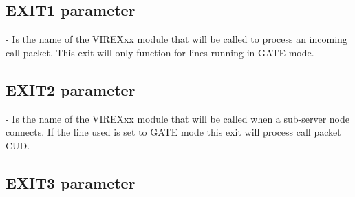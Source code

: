 \documentclass[letterpaper,10pt,english]{sphinxmanual}
\begin{document}
\ignorespaces 

\subsection{EXIT1 parameter}
\label{\detokenize{Installation_Guide:exit1-parameter}}\label{\detokenize{Installation_Guide:index-55}}
\begin{sphinxVerbatim}[commandchars=\\\{\}]
 
\end{sphinxVerbatim}

 - Is the name of the VIREXxx module that will be called to process an incoming call packet. This exit will only function for lines running in GATE mode.

\ignorespaces 

\subsection{EXIT2 parameter}
\label{\detokenize{Installation_Guide:exit2-parameter}}\label{\detokenize{Installation_Guide:index-56}}
\begin{sphinxVerbatim}[commandchars=\\\{\}]
 
\end{sphinxVerbatim}

 - Is the name of the VIREXxx module that will be called when a sub-server node connects. If the line used is set to GATE mode this exit will process call packet CUD.

\ignorespaces 

\subsection{EXIT3 parameter}
\label{\detokenize{Installation_Guide:exit3-parameter}}\label{\detokenize{Installation_Guide:index-57}}
\begin{sphinxVerbatim}[commandchars=\\\{\}]
 
\end{sphinxVerbatim}
\end{document}
